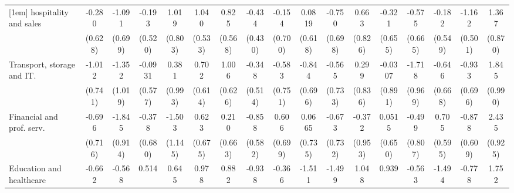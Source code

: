 {\begin{tabular}{l*{16}{c}}
[1em]
hospitality and sales&      -0.280         &      -1.091         &      -0.193         &       1.019         &       1.040         &       0.825         &      -0.434         &      -0.154         &      0.0819         &      -0.750         &       0.663         &      -0.321         &      -0.575         &      -0.182         &      -1.162\sym{*}  &       1.367         \\
                    &     (0.628)         &     (0.699)         &     (0.520)         &     (0.803)         &     (0.533)         &     (0.568)         &     (0.430)         &     (0.700)         &     (0.618)         &     (0.698)         &     (0.826)         &     (0.655)         &     (0.665)         &     (0.549)         &     (0.501)         &     (0.870)         \\
[1em]
Transport, storage and IT.&      -1.012         &      -1.352         &     -0.0931         &       0.381         &       0.702         &       1.006         &      -0.348         &      -0.583         &      -0.844         &      -0.565         &       0.299         &     -0.0307         &      -1.718         &      -0.646         &      -0.933         &       1.845         \\
                    &     (0.741)         &     (1.019)         &     (0.577)         &     (0.993)         &     (0.614)         &     (0.626)         &     (0.514)         &     (0.751)         &     (0.696)         &     (0.733)         &     (0.836)         &     (0.891)         &     (0.969)         &     (0.668)         &     (0.696)         &     (0.990)         \\
[1em]
Financial and prof. serv.&      -0.696         &      -1.845\sym{*}  &      -0.378         &      -1.503         &       0.623         &       0.210         &      -0.858         &       0.606         &      0.0665         &      -0.673         &      -0.372         &      0.0515         &      -0.499         &       0.705         &      -0.878         &       2.435\sym{**} \\
                    &     (0.716)         &     (0.914)         &     (0.680)         &     (1.145)         &     (0.675)         &     (0.663)         &     (0.582)         &     (0.699)         &     (0.735)         &     (0.732)         &     (0.953)         &     (0.650)         &     (0.807)         &     (0.595)         &     (0.609)         &     (0.925)         \\
[1em]
Education and healthcare&      -0.662         &      -0.568         &       0.514         &       0.645         &       0.978         &       0.882         &      -0.938         &      -0.366         &      -1.511         &      -1.499         &       1.048         &       0.939         &      -0.563         &      -1.494         &      -0.778         &       1.752         \\

\end{tabular}}
